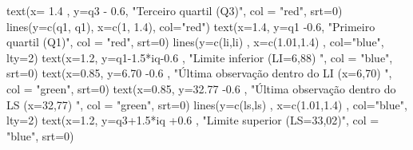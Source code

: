 \documentclass[
]{book}
\newenvironment{Shaded}{\begin{snugshade}}{\end{snugshade}}
\newcommand{\AttributeTok}[1]{\textcolor[rgb]{0.77,0.63,0.00}{#1}}
\newcommand{\DecValTok}[1]{\textcolor[rgb]{0.00,0.00,0.81}{#1}}
\newcommand{\FloatTok}[1]{\textcolor[rgb]{0.00,0.00,0.81}{#1}}
\newcommand{\FunctionTok}[1]{\textcolor[rgb]{0.00,0.00,0.00}{#1}}
\newcommand{\NormalTok}[1]{#1}
\newcommand{\SpecialCharTok}[1]{\textcolor[rgb]{0.00,0.00,0.00}{#1}}
\newcommand{\StringTok}[1]{\textcolor[rgb]{0.31,0.60,0.02}{#1}}
\begin{document}
\begin{Shaded}
\begin{Highlighting}[]
\FunctionTok{text}\NormalTok{(}\AttributeTok{x=} \FloatTok{1.4}\NormalTok{ , }\AttributeTok{y=}\NormalTok{q3 }\SpecialCharTok{{-}} \FloatTok{0.6}\NormalTok{, }\StringTok{"Terceiro quartil (Q3)"}\NormalTok{, }\AttributeTok{col =} \StringTok{"red"}\NormalTok{, }\AttributeTok{srt=}\DecValTok{0}\NormalTok{)}
\FunctionTok{lines}\NormalTok{(}\AttributeTok{y=}\FunctionTok{c}\NormalTok{(q1, q1), }\AttributeTok{x=}\FunctionTok{c}\NormalTok{(}\DecValTok{1}\NormalTok{, }\FloatTok{1.4}\NormalTok{), }\AttributeTok{col=}\StringTok{"red"}\NormalTok{) }
\FunctionTok{text}\NormalTok{(}\AttributeTok{x=}\FloatTok{1.4}\NormalTok{, }\AttributeTok{y=}\NormalTok{q1 }\SpecialCharTok{{-}}\FloatTok{0.6}\NormalTok{, }\StringTok{"Primeiro quartil (Q1)"}\NormalTok{, }\AttributeTok{col =} \StringTok{"red"}\NormalTok{, }\AttributeTok{srt=}\DecValTok{0}\NormalTok{)}
\FunctionTok{lines}\NormalTok{(}\AttributeTok{y=}\FunctionTok{c}\NormalTok{(li,li) , }\AttributeTok{x=}\FunctionTok{c}\NormalTok{(}\FloatTok{1.01}\NormalTok{,}\FloatTok{1.4}\NormalTok{) , }\AttributeTok{col=}\StringTok{"blue"}\NormalTok{, }\AttributeTok{lty=}\DecValTok{2}\NormalTok{) }
\FunctionTok{text}\NormalTok{(}\AttributeTok{x=}\FloatTok{1.2}\NormalTok{, }\AttributeTok{y=}\NormalTok{q1}\FloatTok{{-}1.5}\SpecialCharTok{*}\NormalTok{iq}\FloatTok{{-}0.6}\NormalTok{ , }\StringTok{"Limite inferior (LI=6,88) "}\NormalTok{, }\AttributeTok{col =} \StringTok{"blue"}\NormalTok{, }\AttributeTok{srt=}\DecValTok{0}\NormalTok{)}
\FunctionTok{text}\NormalTok{(}\AttributeTok{x=}\FloatTok{0.85}\NormalTok{, }\AttributeTok{y=}\FloatTok{6.70} \SpecialCharTok{{-}}\FloatTok{0.6}\NormalTok{ , }\StringTok{"Última observação dentro do LI (x=6,70) "}\NormalTok{, }\AttributeTok{col =} \StringTok{"green"}\NormalTok{, }\AttributeTok{srt=}\DecValTok{0}\NormalTok{)}
\FunctionTok{text}\NormalTok{(}\AttributeTok{x=}\FloatTok{0.85}\NormalTok{, }\AttributeTok{y=}\FloatTok{32.77} \SpecialCharTok{{-}}\FloatTok{0.6}\NormalTok{ , }\StringTok{"Última observação dentro do LS (x=32,77) "}\NormalTok{, }\AttributeTok{col =} \StringTok{"green"}\NormalTok{, }\AttributeTok{srt=}\DecValTok{0}\NormalTok{)}
\FunctionTok{lines}\NormalTok{(}\AttributeTok{y=}\FunctionTok{c}\NormalTok{(ls,ls) , }\AttributeTok{x=}\FunctionTok{c}\NormalTok{(}\FloatTok{1.01}\NormalTok{,}\FloatTok{1.4}\NormalTok{) , }\AttributeTok{col=}\StringTok{"blue"}\NormalTok{, }\AttributeTok{lty=}\DecValTok{2}\NormalTok{) }
\FunctionTok{text}\NormalTok{(}\AttributeTok{x=}\FloatTok{1.2}\NormalTok{, }\AttributeTok{y=}\NormalTok{q3}\FloatTok{+1.5}\SpecialCharTok{*}\NormalTok{iq }\SpecialCharTok{+}\FloatTok{0.6}\NormalTok{ , }\StringTok{"Limite superior (LS=33,02)"}\NormalTok{, }\AttributeTok{col =} \StringTok{"blue"}\NormalTok{, }\AttributeTok{srt=}\DecValTok{0}\NormalTok{)}
\end{Highlighting}
\end{Shaded}
\end{document}
